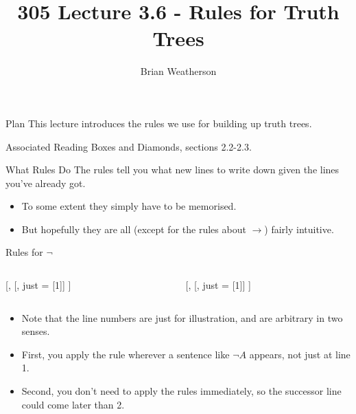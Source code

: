 \documentclass[
  ignorenonframetext,
]{beamer}
\title{305 Lecture 3.6 - Rules for Truth Trees}
\author{Brian Weatherson}
\date{}
\providecommand{\tightlist}{%
  \setlength{\itemsep}{0pt}\setlength{\parskip}{0pt}}
\renewcommand{\,}{\text{, }}
\newenvironment{oltableau}{\center\tableau{}} %
       {\endtableau\endcenter}
\def\True{\mathbb{T}}
\def\False{\mathbb{F}}
\begin{document}
\frame{\titlepage}

\begin{frame}{Plan}
\protect\hypertarget{plan}{}
This lecture introduces the rules we use for building up truth trees.
\end{frame}

\begin{frame}{Associated Reading}
\protect\hypertarget{associated-reading}{}
Boxes and Diamonds, sections 2.2-2.3.
\end{frame}

\begin{frame}{What Rules Do}
\protect\hypertarget{what-rules-do}{}
The rules tell you what new lines to write down given the lines you've
already got.

\begin{itemize}
\tightlist
\item
  To some extent they simply have to be memorised.
\item
  But hopefully they are all (except for the rules about
  \(\rightarrow\)) fairly intuitive.
\end{itemize}
\end{frame}

\begin{frame}{Rules for \(\neg\)}
\protect\hypertarget{rules-for-neg}{}
\begin{columns}[T]
\begin{column}{0.48\textwidth}
\begin{oltableau}
[\sFmla{\True}{\neg A}, 
    [\sFmla{\False}{A}, just = {\TRule{\True}{\neg}[1]}]
]
\end{oltableau}
\end{column}

\begin{column}{0.48\textwidth}
\begin{oltableau}
[\sFmla{\False}{\neg A}, 
    [\sFmla{\True}{A}, just = {\TRule{\False}{\neg}[1]}]
]
\end{oltableau}
\end{column}
\end{columns}

\pause

\begin{itemize}
\tightlist
\item
  Note that the line numbers are just for illustration, and are
  arbitrary in two senses.
\item
  First, you apply the rule wherever a sentence like \(\neg A\) appears,
  not just at line 1.
\item
  Second, you don't need to apply the rules immediately, so the
  successor line could come later than 2.
\end{itemize}
\end{frame}
\end{document}

